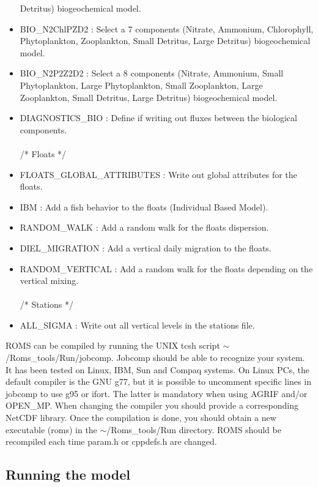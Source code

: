 \begin{itemize}
Detritus) biogeochemical model.
\item BIO\_N2ChlPZD2 : Select a 7 components (Nitrate, Ammonium, Chlorophyll, Phytoplankton, Zooplankton,
Small Detritus, Large Detritus) biogeochemical model. 
\item BIO\_N2P2Z2D2 : Select a 8 components (Nitrate, Ammonium, Small  Phytoplankton, Large Phytoplankton, 
Small Zooplankton, Large Zooplankton,
Small Detritus, Large Detritus) biogeochemical model. 
\item DIAGNOSTICS\_BIO : Define if writing out fluxes between the biological components.
\\ \\ /*           Floats */
\item FLOATS\_GLOBAL\_ATTRIBUTES : Write out global attributes for the floats.
\item IBM  : Add a fish behavior to the floats (Individual Based Model).
\item RANDOM\_WALK : Add a random walk for the floats dispersion.
\item DIEL\_MIGRATION : Add a vertical daily migration to the floats.
\item RANDOM\_VERTICAL : Add a random walk for the floats depending on the vertical mixing.
\\ \\ /*           Stations */
\item ALL\_SIGMA : Write out all vertical levels in the stations file.

\end{itemize}

ROMS can be compiled by running the UNIX tcsh script $\sim$/Roms\_tools/Run/jobcomp.
Jobcomp should be able to recognize your system. It has been tested on 
Linux, IBM, Sun and Compaq systems. On Linux PCs, the default compiler is the GNU g77, 
but it is possible to uncomment specific lines in jobcomp to use g95 or ifort.
The latter is mandatory when using AGRIF and/or OPEN\_MP.
When changing the compiler you should provide a corresponding NetCDF library.
Once the compilation is done, you should obtain a new
executable (roms) in the $\sim$/Roms\_tools/Run directory.
ROMS should be recompiled each time param.h or cppdefs.h are changed.

\subsection{Running the model}

